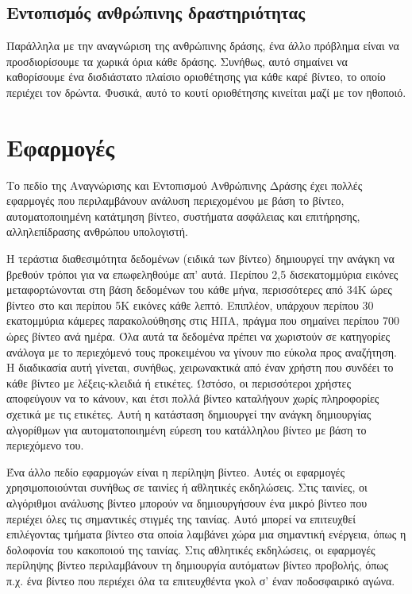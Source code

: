 \subsection{Εντοπισμός ανθρώπινης δραστηριότητας}
Παράλληλα με την αναγνώριση της ανθρώπινης δράσης, ένα άλλο πρόβλημα είναι να προσδιορίσουμε τα χωρικά όρια κάθε δράσης. Συνήθως, αυτό σημαίνει
να καθορίσουμε  ένα δισδιάστατο πλαίσιο οριοθέτησης για κάθε καρέ βίντεο, το οποίο περιέχει τον δρώντα. Φυσικά, αυτό το κουτί οριοθέτησης κινείται μαζί με
τον ηθοποιό.

\section{Εφαρμογές}
Το πεδίο της Αναγνώρισης και Εντοπισμού Ανθρώπινης Δράσης  έχει πολλές εφαρμογές που περιλαμβάνουν
  ανάλυση περιεχομένου με βάση το βίντεο, αυτοματοποιημένη κατάτμηση βίντεο, συστήματα ασφάλειας και επιτήρησης,
αλληλεπίδρασης ανθρώπου υπολογιστή. \par
Η τεράστια διαθεσιμότητα δεδομένων (ειδικά των βίντεο) δημιουργεί την ανάγκη να βρεθούν τρόποι για να επωφεληθούμε απ' αυτά.
Περίπου 2,5 δισεκατομμύρια εικόνες μεταφορτώνονται στη βάση δεδομένων του  κάθε μήνα, περισσότερες από 34K ώρες βίντεο στο  και 
περίπου 5K εικόνες κάθε λεπτό. Επιπλέον, υπάρχουν περίπου 30 εκατομμύρια κάμερες παρακολούθησης στις ΗΠΑ, πράγμα που σημαίνει
περίπου 700 ώρες βίντεο ανά ημέρα. Όλα αυτά τα δεδομένα πρέπει να χωριστούν σε κατηγορίες ανάλογα με το περιεχόμενό τους
προκειμένου να γίνουν πιο εύκολα προς αναζήτηση. Η διαδικασία αυτή γίνεται, συνήθως, χειρωνακτικά από έναν χρήστη που συνδέει το κάθε βίντεο με 
λέξεις-κλειδιά ή ετικέτες. Ωστόσο, οι περισσότεροι χρήστες αποφεύγουν να το κάνουν, και έτσι πολλά βίντεο καταλήγουν χωρίς πληροφορίες σχετικά με τις ετικέτες.
Αυτή η κατάσταση δημιουργεί την ανάγκη δημιουργίας αλγορίθμων για αυτοματοποιημένη εύρεση του κατάλληλου βίντεο με βάση το περιεχόμενο του.

Ένα άλλο πεδίο εφαρμογών είναι η περίληψη βίντεο. Αυτές οι εφαρμογές χρησιμοποιούνται συνήθως σε ταινίες ή αθλητικές εκδηλώσεις. Στις ταινίες,
οι αλγόριθμοι ανάλυσης βίντεο μπορούν να δημιουργήσουν ένα μικρό βίντεο που περιέχει όλες τις σημαντικές στιγμές της ταινίας. Αυτό
μπορεί να επιτευχθεί επιλέγοντας τμήματα βίντεο στα οποία λαμβάνει χώρα μια σημαντική ενέργεια, όπως η δολοφονία του κακοποιού
της ταινίας. Στις αθλητικές εκδηλώσεις, οι εφαρμογές περίληψης βίντεο  περιλαμβάνουν τη δημιουργία αυτόματων βίντεο προβολής, όπως π.χ.
ένα βίντεο που περιέχει όλα τα επιτευχθέντα γκολ σ' έναν ποδοσφαιρικό αγώνα.

